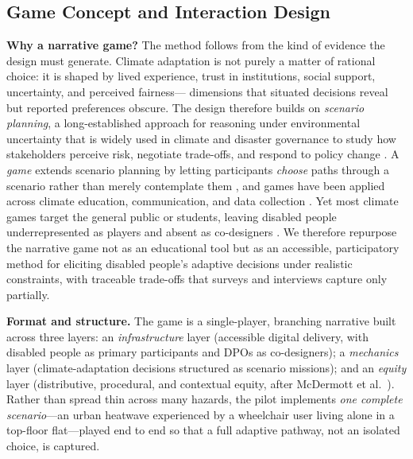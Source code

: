 \documentclass[sigconf]{acmart}
\begin{document}
\subsection{Game Concept and Interaction Design}
\label{sec:game}
\textbf{Why a narrative game?} The method follows from the kind of
evidence the design must generate. Climate adaptation is not purely a
matter of rational choice: it is shaped by lived experience, trust in
institutions, social support, uncertainty, and perceived fairness---
dimensions that situated decisions reveal but reported preferences
obscure. The design therefore builds on \emph{scenario planning}, a
long-established approach for reasoning under environmental uncertainty
\cite{wack1985scenarios,bowman2013storytelling} that is widely used in
climate and disaster governance to study how stakeholders perceive risk,
negotiate trade-offs, and respond to policy change
\cite{TannenbaumBaruchi2024}. A \emph{game} extends scenario planning by
letting participants \emph{choose} paths through a scenario rather than
merely contemplate them \cite{somerdin2016game}, and games have been
applied across climate education, communication, and data collection
\cite{gerber2021games,mcgonigal2011reality,ulrich2014gaming}. Yet most
climate games target the general public or students, leaving disabled
people underrepresented as players and absent as co-designers
\cite{o2010values}. We therefore repurpose the narrative game not as an
educational tool but as an accessible, participatory method for eliciting
disabled people's adaptive decisions under realistic constraints, with
traceable trade-offs that surveys and interviews capture only partially.

\textbf{Format and structure.} The game is a single-player, branching
narrative built across three layers: an \emph{infrastructure} layer
(accessible digital delivery, with disabled people as primary
participants and DPOs as co-designers); a \emph{mechanics} layer
(climate-adaptation decisions structured as scenario missions); and an
\emph{equity} layer (distributive, procedural, and contextual equity,
after McDermott et al.\ \cite{mcdermott2013examining}). Rather than spread
thin across many hazards, the pilot implements \emph{one complete
scenario}---an urban heatwave experienced by a wheelchair user living
alone in a top-floor flat---played end to end so that a full adaptive
pathway, not an isolated choice, is captured.
\end{document}

